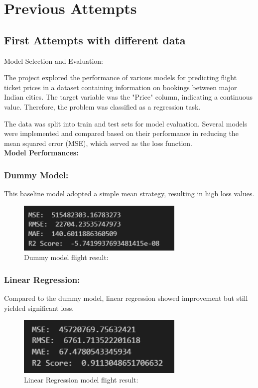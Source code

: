 \documentclass{article}
\begin{document}
\newpage
\section{Previous Attempts}
\subsection{First Attempts with different data}
Model Selection and Evaluation:

The project explored the performance of various models for predicting flight ticket prices in a dataset containing information on bookings between major Indian cities. The target variable was the "Price" column, indicating a continuous value. Therefore, the problem was classified as a regression task.

The data was split into train and test sets for model evaluation. Several models were implemented and compared based on their performance in reducing the mean squared error (MSE), which served as the loss function.\\

\textbf{Model Performances:}\\


\subsubsection{Dummy Model:}
This baseline model adopted a simple mean strategy, resulting in high loss values.
\begin{figure}[H]
    \caption{Dummy model flight result:}
    \centering
    \includegraphics[width=8cm]{imgFolder/dummyModelFlight.png}
\end{figure}

\subsubsection{Linear Regression: }Compared to the dummy model, linear regression showed improvement but still yielded significant loss.
\begin{figure}[H]
    \caption{Linear Regression model flight result:}
    \centering
    \includegraphics[width=8cm]{imgFolder/linearRegressionFlight.png}
\end{figure}
\end{document}
